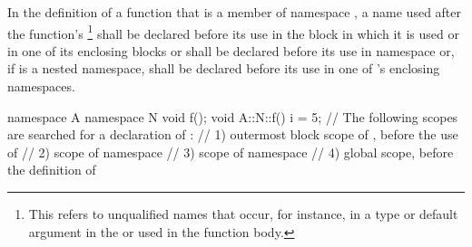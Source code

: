 \pnum
In the definition of a function that is a member of namespace ,
a name used after the function's
\footnote{This refers to unqualified names
that occur, for instance, in
a type or default argument in the
 or used in the function body.}
shall be
declared before its use in the block in which it is used or in one of
its enclosing blocks or shall be declared before its
use in namespace  or, if  is a nested namespace, shall
be declared before its use in one of 's enclosing namespaces.
\begin{example}

\begin{codeblock}
namespace A {
  namespace N {
    void f();
  }
}
void A::N::f() {
  i = 5;
  // The following scopes are searched for a declaration of :
  // 1) outermost block scope of , before the use of 
  // 2) scope of namespace 
  // 3) scope of namespace 
  // 4) global scope, before the definition of 
}
\end{codeblock}
\end{example}

